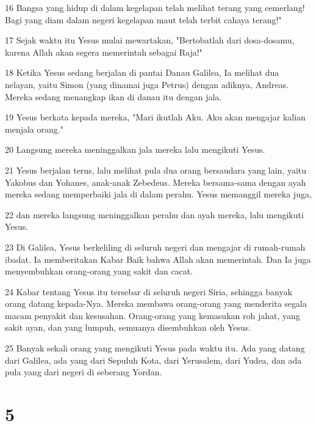 \par 16 Bangsa yang hidup di dalam kegelapan telah melihat terang yang cemerlang! Bagi yang diam dalam negeri kegelapan maut telah terbit cahaya terang!"
\par 17 Sejak waktu itu Yesus mulai mewartakan, "Bertobatlah dari dosa-dosamu, karena Allah akan segera memerintah sebagai Raja!"
\par 18 Ketika Yesus sedang berjalan di pantai Danau Galilea, Ia melihat dua nelayan, yaitu Simon (yang dinamai juga Petrus) dengan adiknya, Andreas. Mereka sedang menangkap ikan di danau itu dengan jala.
\par 19 Yesus berkata kepada mereka, "Mari ikutlah Aku. Aku akan mengajar kalian menjala orang."
\par 20 Langsung mereka meninggalkan jala mereka lalu mengikuti Yesus.
\par 21 Yesus berjalan terus, lalu melihat pula dua orang bersaudara yang lain, yaitu Yakobus dan Yohanes, anak-anak Zebedeus. Mereka bersama-sama dengan ayah mereka sedang memperbaiki jala di dalam perahu. Yesus memanggil mereka juga,
\par 22 dan mereka langsung meninggalkan perahu dan ayah mereka, lalu mengikuti Yesus.
\par 23 Di Galilea, Yesus berkeliling di seluruh negeri dan mengajar di rumah-rumah ibadat. Ia memberitakan Kabar Baik bahwa Allah akan memerintah. Dan Ia juga menyembuhkan orang-orang yang sakit dan cacat.
\par 24 Kabar tentang Yesus itu tersebar di seluruh negeri Siria, sehingga banyak orang datang kepada-Nya. Mereka membawa orang-orang yang menderita segala macam penyakit dan kesusahan. Orang-orang yang kemasukan roh jahat, yang sakit ayan, dan yang lumpuh, semuanya disembuhkan oleh Yesus.
\par 25 Banyak sekali orang yang mengikuti Yesus pada waktu itu. Ada yang datang dari Galilea, ada yang dari Sepuluh Kota, dari Yerusalem, dari Yudea, dan ada pula yang dari negeri di seberang Yordan.

\chapter{5}

